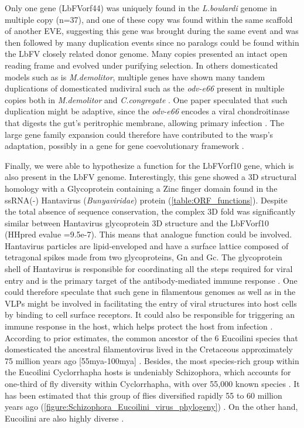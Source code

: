 Only one gene (LbFVorf44) was uniquely found in the \textit{L.boulardi} genome in multiple copy (n=37), and one of these copy was found within the same scaffold of another EVE, suggesting this gene was brought during the same event and was then followed by many duplication events since no paralogs could be found within the LbFV closely related donor genome. Many copies presented an intact open reading frame and evolved under purifying selection. In others domesticated models such as is \textit{M.demolitor}, multiple genes have shown many tandem duplications of domesticated nudiviral such as the \textit{odv-e66} present in multiple copies both in \textit{M.demolitor} and \textit{C.congregate} \citep{gauthier_chromosomal_2021}. One paper speculated that such duplication might be adaptive, since the \textit{odv-e66} encodes a viral chondroitinase that digests the gut's peritrophic membrane, allowing primary infection \citep{gauthier_chromosomal_2021}. The large gene family expansion could therefore have contributed to the wasp's adaptation, possibly in a gene for gene coevolutionary framework \citep{gauthier_chromosomal_2021}. 

Finally, we were able to hypothesize a function for the  LbFVorf10 gene, which is also present in the LbFV genome. Interestingly, this gene showed a 3D structural homology with a Glycoprotein containing a Zinc finger domain found in the ssRNA(-) Hantavirus (\textit{Bunyaviridae}) protein (\figurename{\ref{table:ORF_functions}}). Despite the total absence of sequence conservation, the complex 3D fold was significantly similar between Hantavirus glycoprotein 3D structure and the LbFVorf10  (HHpred evalue =9.5e-7). This means that analogue function could be involved. Hantavirus particles are lipid-enveloped and have a surface lattice composed of tetragonal spikes made from two glycoproteins, Gn and Gc. The glycoprotein shell of Hantavirus is responsible for coordinating all the steps required for viral entry and is the primary target of the antibody-mediated immune response \citep{guardado-calvo_surface_2021}. One could therefore speculate that such gene in filamentous genomes as well as in the VLPs might be involved in facilitating the entry of viral structures into host cells by binding to cell surface receptors. It could also be responsible for triggering an immune response in the host, which helps protect the host from infection \citep{guardado-calvo_surface_2021}.\\

According to prior estimates, the common ancestor of the 6 Eucoilini species that domesticated the ancestral filamentovirus lived in the Cretaceous approximately 75 million years ago [55mya-100mya] \citep{blaimer_comprehensive_2020}. Besides, the most species-rich group within the Eucoilini Cyclorrhapha hosts is undeniably Schizophora, which accounts for one-third of fly diversity within Cyclorrhapha, with over 55,000 known species \citep{bayless_beyond_2021}. It has been estimated that this group of flies diversified rapidly 55 to 60 million years ago (\figurename{\ref{figure:Schizophora_Eucoilini_virus_phylogeny}}) \citep{bayless_beyond_2021}. On the other hand, Eucoilini are also highly diverse \citep{fontal-cazalla_phylogeny_2002,ronquist_phylogeny_1995}.

